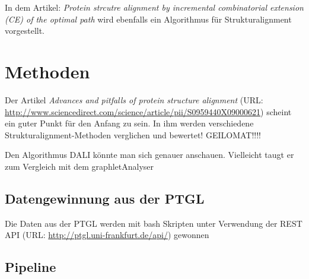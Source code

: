 \documentclass{article}
\begin{document}
In dem Artikel: \textit{Protein strcutre alignment by incremental combinatorial extension (CE) of the optimal path} wird ebenfalls ein Algorithmus f\"ur Strukturalignment vorgestellt. 

\section{Methoden}
Der Artikel \textit{Advances and pitfalls of protein structure alignment} (URL: \url{http://www.sciencedirect.com/science/article/pii/S0959440X09000621}) scheint ein guter Punkt f\"ur den Anfang zu sein.
In ihm werden verschiedene Strukturalignment-Methoden verglichen und bewertet! GEILOMAT!!!!


Den Algorithmus DALI k\"onnte man sich genauer anschauen. Vielleicht taugt er zum Vergleich mit dem graphletAnalyser

\subsection{Datengewinnung aus der PTGL}

Die Daten aus der PTGL werden mit bash Skripten unter Verwendung der REST API (URL: \url{http://ptgl.uni-frankfurt.de/api/}) gewonnen

\subsection{Pipeline}
\end{document}
